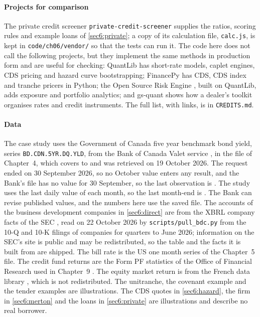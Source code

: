 \begin{chapterrefs}
\paragraph{Projects for comparison}
The private credit screener \texttt{private-credit-screener} \parencite{pcscreener} supplies the ratios, scoring rules and example
loans of \cref{sec6:private}; a copy of its calculation file, \texttt{calc.js}, is kept in
\texttt{code/ch06/vendor/} so that the tests can run it. The code here does not call the following
projects, but they implement the same methods in production form and are useful for checking:
QuantLib \parencite{quantlib} has short-rate models, caplet engines, CDS pricing and hazard curve bootstrapping;
FinancePy \parencite{financepy} has CDS, CDS index and tranche pricers in Python; the Open Source Risk Engine \parencite{ore}, built on
QuantLib, adds exposure and portfolio analytics; and gs-quant \parencite{gsquant} shows how a dealer's toolkit
organises rates and credit instruments. The full list, with links, is in \texttt{CREDITS.md}.

\paragraph{Data}
The case study uses the Government of Canada five year benchmark bond yield, series
\texttt{BD.CDN.5YR.DQ.YLD}, from the Bank of Canada Valet service \parencite{bocvalet}, in the file of
Chapter~4, which covers \bdFirst{} to \bdDate{} and was retrieved on 19 October 2026. The request
ended on 30 September 2026, so no October value enters any result, and the Bank's file has no value
for 30 September, so the last observation is \bdDate. The
study uses the last daily value of each month, so the last month-end is \csMatLast. The Bank can revise
published values, and the numbers here use the saved file. The accounts of the business development
companies in \cref{sec6:direct} are from the XBRL company facts of the SEC \parencite{secxbrl}, read on
22 October 2026 by \texttt{scripts/pull\_bdc.py} from the 10-Q and 10-K filings of \dlFirms{} companies
for quarters to June 2026; information on the SEC's site is public and may be redistributed, so the
table and the facts it is built from are shipped. The bill rate is the US one month series of the
Chapter~5 file. The credit fund returns are the Form PF statistics of the Office of Financial Research
used in Chapter~9 \parencite{ofrhfm}. The equity market return is from the French data library
\parencite{frenchlib}, which is not redistributed. The unitranche, the covenant example and the tender examples are
illustrations. The CDS quotes in \cref{sec6:hazard}, the
firm in \cref{sec6:merton} and the loans in \cref{sec6:private} are illustrations and describe no real
borrower.

\end{chapterrefs}
